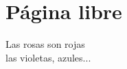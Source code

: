 \section*{Página libre}
\begin{flushleft}
Las rosas son rojas\\
las violetas, azules...
\end{flushleft}
